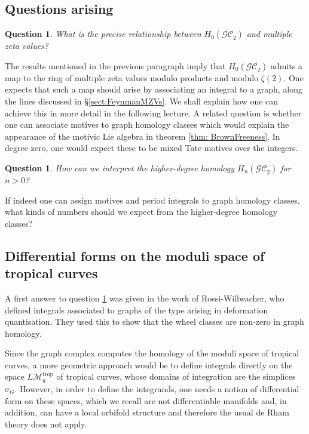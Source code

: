 \documentclass[12pt]{amsart}
\theoremstyle{plain}
\newtheorem{quest}[thm]{Question}
\newcommand{\LM}{L\mathcal{M}}
\newcommand{\trop}{\mathrm{trop}}
\newcommand{\GC}{\mathcal{GC}}
\newcommand{\0}{\color{blue}{\mathsf{0}}}
\begin{document}
\subsection{Questions arising} 

\begin{quest} \label{quest1} What is the precise relationship between $H_0(\GC_2)$ and multiple zeta values? 
\end{quest} 

The  results  mentioned in  the previous paragraph imply  that $H_0(\GC_2)$ admits a map to the ring of  multiple zeta values modulo products and modulo $\zeta(2)$.
One expects that such a map should  arise by associating an integral to a graph, along the lines discussed in \S \ref{sect:FeynmanMZVs}.
We shall explain how one can achieve this in more detail  in the following lecture.
A related question is whether one can  associate motives to graph homology classes which would explain the appearance of the motivic Lie algebra  in theorem \ref{thm: BrownFreeness}. In degree zero, one would expect these to be mixed Tate motives over the integers. 

\begin{quest} \label{quest2} How can  we interpret the higher-degree homology $H_n(\GC_2)$ for $n>0$?
\end{quest}

If indeed one can assign motives and period integrals to graph homology classes, what kinds of numbers should we expect from the higher-degree homology classes?  






\subsection{Differential forms on the moduli space of tropical curves}
A first answer to question \ref{quest1}  was given in the work of Rossi-Willwacher, who defined integrals associated to graphs of the type arising in deformation quantisation. They used this to show that the wheel classes are non-zero in graph homology.


 Since the graph complex computes the homology of the moduli space of tropical curves,  a more geometric approach would be to define integrals directly on the space $\LM_g^{\trop}$ of tropical curves, whose domains of integration  are the simplices $\sigma_G$. 
However, in order to define the integrands, one needs a notion of differential form on these spaces, which we recall are not differentiable  manifolds and, in addition, can have a local orbifold structure and therefore  the usual de Rham theory does not apply.
\end{document}
